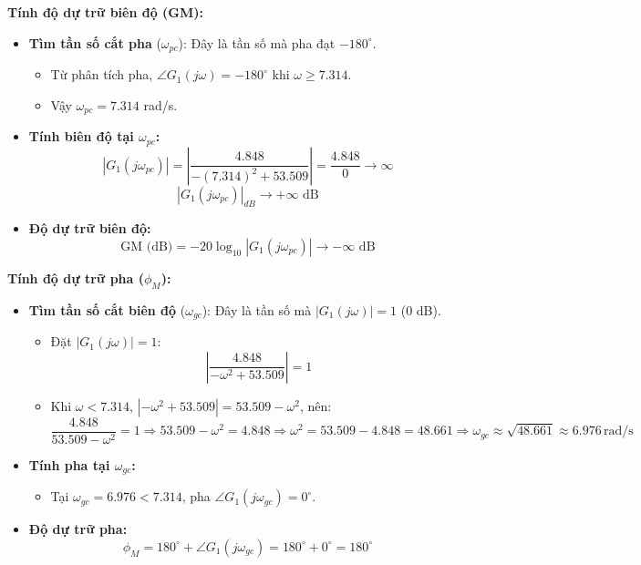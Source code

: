     \textbf{Tính độ dự trữ biên độ (GM):}
    \begin{itemize}
        \item \textbf{Tìm tần số cắt pha} ($\omega_{pc}$): Đây là tần số mà pha đạt $-180^\circ$.
        \begin{itemize}
            \item Từ phân tích pha, $\angle G_1(j\omega) = -180^\circ$ khi $\omega \geq 7.314$.
            \item Vậy $\omega_{pc} = 7.314$ rad/s.
        \end{itemize}
        \item \textbf{Tính biên độ tại $\omega_{pc}$:}
            \[
            |G_1(j\omega_{pc})| = \left| \frac{4.848}{-(7.314)^2 + 53.509} \right| = \frac{4.848}{0} \to \infty
            \]
            \[
            |G_1(j\omega_{pc})|_{dB} \to +\infty \text{ dB}
            \]
            
            \item \textbf{Độ dự trữ biên độ:}
            \[
            \text{GM (dB)} = -20 \log_{10} |G_1(j\omega_{pc})| \to -\infty \text{ dB}
            \]
        \end{itemize}
\textbf{Tính độ dự trữ pha ($\phi_M$):}           
            \begin{itemize}
                \item \textbf{Tìm tần số cắt biên độ} ($\omega_{gc}$): Đây là tần số mà $|G_1(j\omega)| = 1$ (0 dB).
                \begin{itemize}
                    \item Đặt $|G_1(j\omega)| = 1$:
                    \[
                    \left| \frac{4.848}{-\omega^2 + 53.509} \right| = 1
                    \]
                    \item Khi $\omega < 7.314$, $|-\omega^2 + 53.509| = 53.509 - \omega^2$, nên:
                    \[
                    \frac{4.848}{53.509 - \omega^2} = 1 \Rightarrow 53.509 - \omega^2 = 4.848 \Rightarrow \omega^2 = 53.509 - 4.848 = 48.661
                    \Rightarrow \omega_{gc} \approx \sqrt{48.661} \approx 6.976 \, \text{rad/s}
                    \]
                \end{itemize}
                
                \item \textbf{Tính pha tại $\omega_{gc}$:}
                \begin{itemize}
                    \item Tại $\omega_{gc} = 6.976 < 7.314$, pha $\angle G_1(j\omega_{gc}) = 0^\circ$.
                \end{itemize}
                
                \item \textbf{Độ dự trữ pha:}
                \[
                \phi_M = 180^\circ + \angle G_1(j\omega_{gc}) = 180^\circ + 0^\circ = 180^\circ
                \]
            \end{itemize}
        

